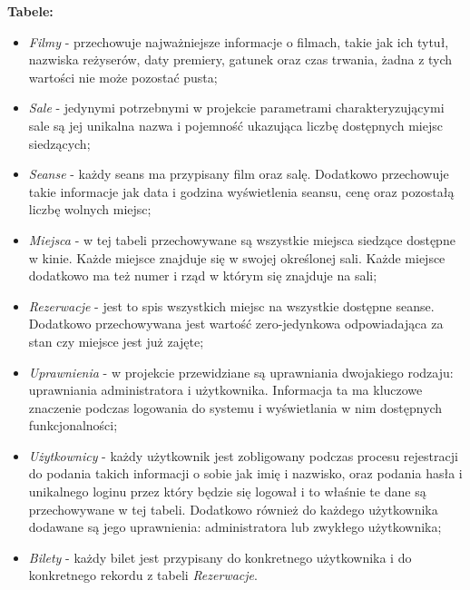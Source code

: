 \textbf{Tabele:}
\begin{itemize}
	\item \textit{Filmy} - przechowuje najważniejsze informacje o filmach, takie jak ich tytuł, nazwiska reżyserów, daty premiery, gatunek oraz czas trwania, żadna z tych wartości nie może pozostać pusta;
	\item \textit{Sale}	- jedynymi potrzebnymi w projekcie parametrami charakteryzującymi sale są jej unikalna nazwa i pojemność ukazująca liczbę dostępnych miejsc siedzących;
	\item \textit{Seanse} - każdy seans ma przypisany film oraz salę. Dodatkowo przechowuje takie informacje jak data i godzina wyświetlenia seansu, cenę oraz pozostałą liczbę wolnych miejsc;
	\item \textit{Miejsca} - w tej tabeli przechowywane są wszystkie miejsca siedzące dostępne w kinie. Każde miejsce znajduje się w swojej określonej sali. Każde miejsce dodatkowo ma też numer i rząd w którym się znajduje na sali;
	\item \textit{Rezerwacje} - jest to spis wszystkich miejsc na wszystkie dostępne seanse. Dodatkowo przechowywana jest wartość zero-jedynkowa odpowiadająca za stan czy miejsce jest już zajęte;
	\item \textit{Uprawnienia} - w projekcie przewidziane są uprawniania dwojakiego rodzaju: uprawniania administratora i użytkownika. Informacja ta ma kluczowe znaczenie podczas logowania do systemu i wyświetlania w nim dostępnych funkcjonalności;
	\item \textit{Użytkownicy} - każdy użytkownik jest zobligowany podczas procesu rejestracji do podania takich informacji o sobie jak imię i nazwisko, oraz podania hasła i unikalnego loginu przez który będzie się logował i to właśnie te dane są przechowywane w tej tabeli. Dodatkowo również do każdego użytkownika dodawane są jego uprawnienia: administratora lub zwykłego użytkownika;
	\item \textit{Bilety} - każdy bilet jest przypisany do konkretnego użytkownika i do konkretnego rekordu z tabeli \textit{Rezerwacje}.
\end{itemize}